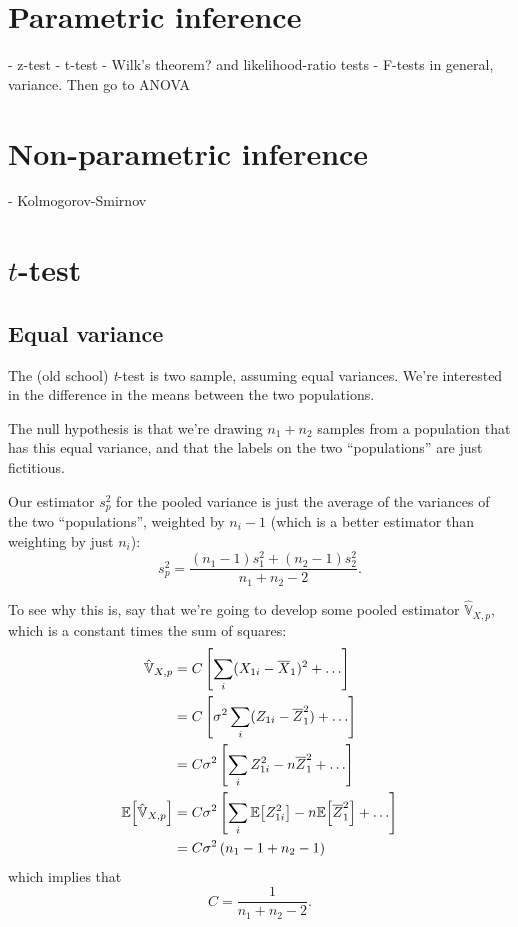 \section{Parametric inference}

- z-test
- t-test
- Wilk's theorem? and likelihood-ratio tests
- F-tests in general, variance. Then go to ANOVA

\section{Non-parametric inference}

- Kolmogorov-Smirnov

\section{$t$-test}

\subsection{Equal variance}\label{equal-variance}

The (old school) \emph{t}-test is two sample, assuming equal variances.
We're interested in the difference in the means between the two
populations.

The null hypothesis is that we're drawing \(n_1 + n_2\) samples from a
population that has this equal variance, and that the labels on the two
``populations'' are just fictitious.

Our estimator \(s_p^2\) for the pooled variance is just the average of
the variances of the two ``populations'', weighted by \(n_i - 1\) (which
is a better estimator than weighting by just \(n_i\)): \[
s_p^2 = \frac{(n_1 - 1) s_1^2 + (n_2 - 1) s_2^2}{n_1 + n_2 - 2}.
\]

To see why this is, say that we're going to develop some pooled estimator
$\hat{\mathbb{V}}_{X,p}$, which is a constant times the sum of squares:
\begin{align}
\hat{\mathbb{V}}_{X,p} &= C \left[ \sum_i (X_{1i} - \overline{X}_1)^2 + \ldots \right] \\
  &= C \left[ \sigma^2 \sum_i (Z_{1i} - \overline{Z}_1^2 ) + \ldots \right] \\
  &= C \sigma^2 \left[ \sum_i Z_{1i}^2 - n \overline{Z}_1^2 + \ldots \right] \\
\mathbb{E}\!\left[{\hat{\mathbb{V}}_{X,p}}\right] &= C \sigma^2 \left[ \sum_i \mathbb{E}\!\left[{Z_{1i}^2}\right] - n \mathbb{E}\!\left[{\overline{Z}_1^2}\right] + \ldots \right] \\
  &= C \sigma^2 \left( n_1 - 1 + n_2 - 1 \right) \\
\end{align}
which implies that
\begin{equation}
C = \frac{1}{n_1 + n_2 - 2}.
\end{equation}

